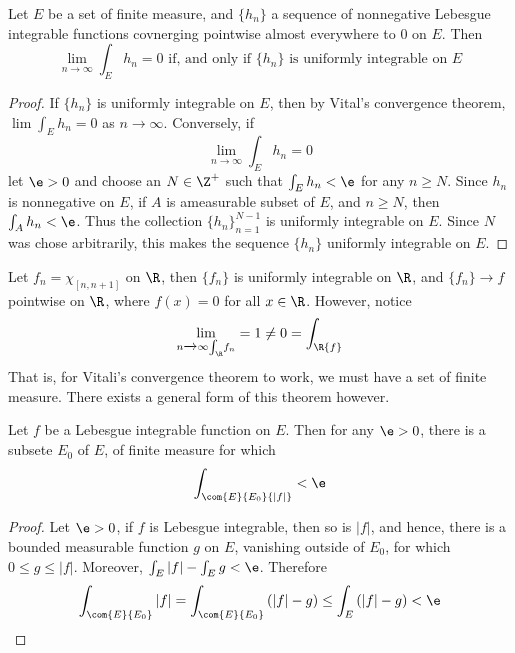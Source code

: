 \begin{theorem}\label{10.5.5}
    Let $E$ be a set of finite measure, and  $\{h_n\}$ a sequence of nonnegative
    Lebesgue integrable functions covnerging pointwise almost everywhere to $0$
    on  $E$. Then
    \begin{equation*}
        \lim_{n \xrightarrow{} \infty}{\int_E{h_n}}=0 \text{ if, and only if }
        \{h_n\} \text{ is uniformly integrable on } E
    \end{equation*}
\end{theorem}
\begin{proof}
    If $\{h_n\}$ is uniformly integrable on $E$, then by Vital's convergence
    theorem, $\lim{\int_E{h_n}}=0$ as $n \xrightarrow{} \infty$. Conversely, if
    \begin{equation*}
        \lim_{n \xrightarrow{} \infty}\int_E{h_n}=0
    \end{equation*}
    let $\e>0$ and choose an  $N \in \Z^+$ such that  $\int_E{h_n}<\e$ for any
    $n \geq N$. Since  $h_n$ is nonnegative on  $E$, if  $A$ is ameasurable
    subset of  $E$, and  $n \geq N$, then  $\int_A{h_n}<\e$. Thus the collection
    $\{h_n\}_{n=1}^{N-1}$ is uniformly integrable on $E$. Since  $N$ was chose
    arbitrarily, this makes the sequence $\{h_n\}$ uniformly integrable on $E$.
\end{proof}

\begin{example}\label{example_10.6}
    Let $f_n=\chi_{[n,n+1]}$ on $\R$, then  $\{f_n\}$ is uniformly integrable on
    $\R$, and $\{f_n\} \xrightarrow{} f$ pointwise on $\R$, where $f(x)=0$ for
    all $x \in \R$. However, notice
    \begin{equation*}
        \lim_{n \xrightarrow{} \infty{\int_\R}{f_n}}=1 \neq 0=\int_\R{f}
    \end{equation*}
    That is, for Vitali's convergence theorem to work, we must have a set of
    finite measure. There exists a general form of this theorem however.
\end{example}

\begin{lemma}\label{10.5.6}
    Let $f$ be a Lebesgue integrable function on  $E$. Then for any  $\e>0$,
    there is a subsete $E_0$ of $E$, of finite measure for which
    \begin{equation*}
        \int_{\com{E}{E_0}{|f|}}<\e
    \end{equation*}
\end{lemma}
\begin{proof}
    Let $\e>0$, if  $f$ is Lebesgue integrable, then so is  $|f|$, and hence,
    there is a bounded measurable function  $g$ on  $E$, vanishing outside of
    $E_0$, for which $0 \leq  g \leq |f|$. Moreover, $\int_E{|f|}-\int_E{g}<\e$.
    Therefore
    \begin{equation*}
        \int_{\com{E}{E_0}}{|f|}=\int_{\com{E}{E_0}}{(|f|-g)} \leq
        \int_E{(|f|-g)}<\e
    \end{equation*}
\end{proof}


